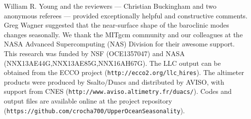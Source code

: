 \documentclass[grl]{agutex2015}
\begin{document}
\begin{article}
%
%




%

\begin{acknowledgments}
 William R. Young and the reviewers --- Christian Buckingham and two anonymous referees ---
  provided exceptionally helpful and constructive comments. Greg Wagner
 suggested that the near-surface shape of the baroclinic modes changes seasonally.
 We thank the MITgcm community and our colleagues at the NASA Advanced
Supercomputing (NAS) Division for their awesome support.
This research was funded by NSF (OCE1357047) and NASA (NNX13AE44G,NNX13AE85G,NNX16AH67G).
The LLC output can be obtained from the ECCO project (\texttt{http://ecco2.org/llc$\_$hires}). The altimeter products were produced by Ssalto/Duacs
and distributed by AVISO, with support from CNES (\texttt{http://www.aviso.altimetry.fr/duacs/}).
Codes and output files are available online at the project repository
 (\texttt{https://github.com/crocha700/UpperOceanSeasonality}).
\end{acknowledgments}


\end{article}
\end{document}
